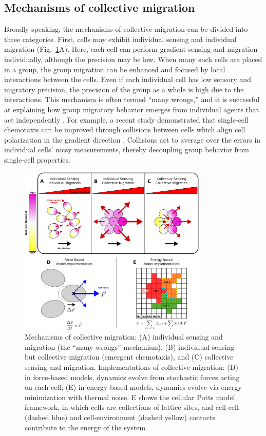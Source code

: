 \subsection{Mechanisms of collective migration}

Broadly speaking, the mechanisms of collective migration can be divided into three categories. First, cells may exhibit individual sensing and individual migration (Fig.\ \ref{models}A). Here, each cell can perform gradient sensing and migration individually, although the precision may be low. When many such cells are placed in a group, the group migration can be enhanced and focused by local interactions between the cells. Even if each individual cell has low sensory and migratory precision, the precision of the group as a whole is high due to the interactions. This mechanism is often termed ``many wrongs,'' and it is successful at explaining how group migratory behavior emerges from individual agents that act independently \cite{simons2004many}. For example, a recent study demonstrated that single-cell chemotaxis can be improved through collisions between cells which align cell polarization in the gradient direction \cite{coburn2013tactile}. Collisions act to average over the errors in individual cells' noisy measurements, thereby decoupling group behavior from single-cell properties.



\begin{figure}[ht]
    \centering
        \includegraphics[width=0.8\textwidth]{../fig/ch1_fig3.pdf}
    \caption{Mechanisms of collective migration: (A) individual sensing and migration (the ``many wrongs'' mechanism), (B) individual sensing but collective migration (emergent chemotaxis), and (C) collective sensing and migration. Implementations of collective migration: (D) in force-based models, dynamics evolve from stochastic forces acting on each cell; (E) in energy-based models, dynamics evolve via energy minimization with thermal noise. E shows the cellular Potts model framework, in which cells are collections of lattice sites, and cell-cell (dashed blue) and cell-environment (dashed yellow) contacts contribute to the energy of the system.}
\label{models}
\end{figure}



